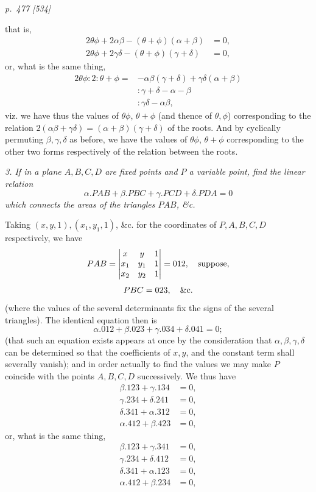 \documentclass[11pt,a4paper]{article}
\theoremstyle{plain}
\theoremstyle{definition}
\newcommand{\sect}[1]{\medskip\noindent\textit{#1}}
\begin{document}
\bigskip
\textit{p.~477 [534]}
\smallskip

\noindent
that is,
\[
\begin{split}
        2\theta\phi+2\alpha\beta-(\theta+\phi)(\alpha+\beta)&=0,\\
        2\theta\phi+2\gamma\delta-(\theta+\phi)(\gamma+\delta)&=0,
\end{split}
\]
or, what is the same thing,
\[
\begin{split}
2\theta\phi:2:\theta+\phi
={}&-\alpha\beta(\gamma+\delta)+\gamma\delta(\alpha+\beta)\\
&:\gamma+\delta-\alpha-\beta\\
&:\gamma\delta-\alpha\beta,
\end{split}
\]
viz. we have thus the values of $\theta\phi$, $\theta+\phi$ (and thence of
$\theta,\phi$) corresponding to the relation
$2(\alpha\beta+\gamma\delta)=(\alpha+\beta)(\gamma+\delta)$ of the roots.
And by cyclically permuting $\beta,\gamma,\delta$ as before, we have the values of
$\theta\phi$, $\theta+\phi$ corresponding to the other two forms respectively of
the relation between the roots.

\sect{3. If in a plane $A,B,C,D$ are fixed points and $P$ a variable point, find
the linear relation}
\[
        \alpha.PAB+\beta.PBC+\gamma.PCD+\delta.PDA=0
\]
\sect{which connects the areas of the triangles $PAB$, \&c.}

Taking $(x,y,1),(x_1,y_1,1)$, \&c. for the coordinates of $P,A,B,C,D$ respectively,
we have
\[
PAB=
\begin{vmatrix}
x&y&1\\
x_1&y_1&1\\
x_2&y_2&1
\end{vmatrix}
=012,\quad\hbox{suppose,}
\]
\[
        PBC=023,\quad\hbox{\&c.}
\]
(where the values of the several determinants fix the signs of the several
triangles). The identical equation then is
\[
        \alpha.012+\beta.023+\gamma.034+\delta.041=0;
\]
(that such an equation exists appears at once by the consideration that
$\alpha,\beta,\gamma,\delta$ can be determined so that the coefficients of $x,y$,
and the constant term shall severally vanish); and in order actually to find the
values we may make $P$ coincide with the points $A,B,C,D$ successively. We thus
have
\[
\begin{split}
\beta.123+\gamma.134&=0,\\
\gamma.234+\delta.241&=0,\\
\delta.341+\alpha.312&=0,\\
\alpha.412+\beta.423&=0,
\end{split}
\]
or, what is the same thing,
\[
\begin{split}
\beta.123+\gamma.341&=0,\\
\gamma.234+\delta.412&=0,\\
\delta.341+\alpha.123&=0,\\
\alpha.412+\beta.234&=0,
\end{split}
\]
\clearpage
\end{document}
